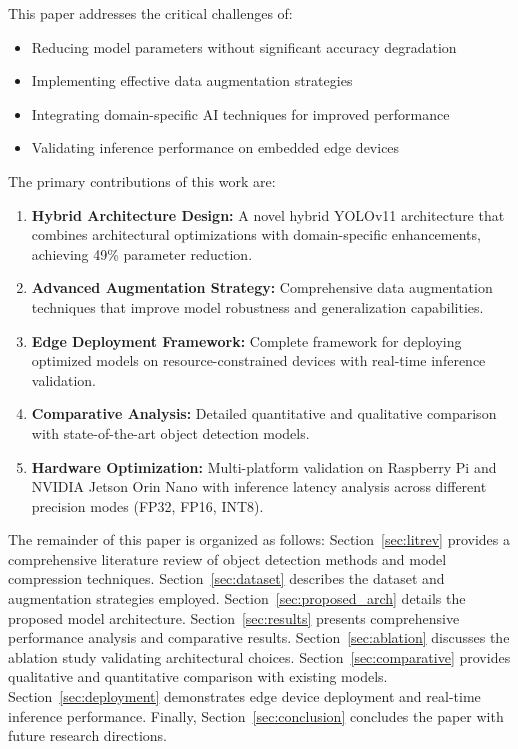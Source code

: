 \documentclass[11pt,a4paper]{article}
\begin{document}
This paper addresses the critical challenges of:
\begin{itemize}
    \item Reducing model parameters without significant accuracy degradation
    \item Implementing effective data augmentation strategies
    \item Integrating domain-specific AI techniques for improved performance
    \item Validating inference performance on embedded edge devices
\end{itemize}

The primary contributions of this work are:
\begin{enumerate}
    \item \textbf{Hybrid Architecture Design:} A novel hybrid YOLOv11 architecture that combines 
    architectural optimizations with domain-specific enhancements, achieving 49\% parameter reduction.
    
    \item \textbf{Advanced Augmentation Strategy:} Comprehensive data augmentation techniques that 
    improve model robustness and generalization capabilities.
    
    \item \textbf{Edge Deployment Framework:} Complete framework for deploying optimized models on 
    resource-constrained devices with real-time inference validation.
    
    \item \textbf{Comparative Analysis:} Detailed quantitative and qualitative comparison with 
    state-of-the-art object detection models.
    
    \item \textbf{Hardware Optimization:} Multi-platform validation on Raspberry Pi and NVIDIA 
    Jetson Orin Nano with inference latency analysis across different precision modes (FP32, FP16, INT8).
\end{enumerate}

The remainder of this paper is organized as follows: Section~\ref{sec:litrev} provides a comprehensive 
literature review of object detection methods and model compression techniques. Section~\ref{sec:dataset} 
describes the dataset and augmentation strategies employed. Section~\ref{sec:proposed_arch} details the 
proposed model architecture. Section~\ref{sec:results} presents comprehensive performance analysis and 
comparative results. Section~\ref{sec:ablation} discusses the ablation study validating architectural choices. 
Section~\ref{sec:comparative} provides qualitative and quantitative comparison with existing models. 
Section~\ref{sec:deployment} demonstrates edge device deployment and real-time inference performance. 
Finally, Section~\ref{sec:conclusion} concludes the paper with future research directions.
\end{document}
